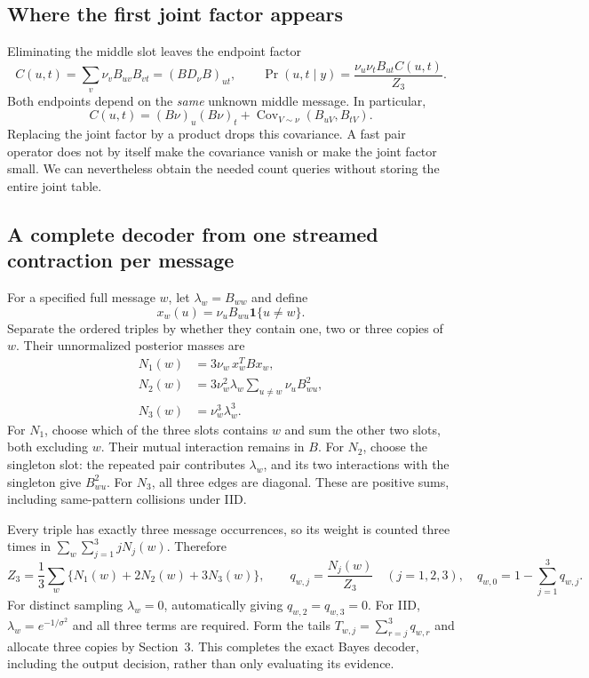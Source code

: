 \documentclass[10pt,a4paper]{article}
\newcommand{\ind}{\mathbf 1}
\begin{document}
\subsection{Where the first joint factor appears}
Eliminating the middle slot leaves the endpoint factor
\begin{equation}
 C(u,t)=\sum_v\nu_v B_{uv}B_{vt}=(BD_\nu B)_{ut},\qquad
 \Pr(u,t\mid y)=\frac{\nu_u\nu_t B_{ut}C(u,t)}{Z_3}.
 \label{eq:triangle-separator}
\end{equation}
Both endpoints depend on the \emph{same} unknown middle message. In particular,
\[
 C(u,t)=(B\nu)_u(B\nu)_t+
 \operatorname{Cov}_{V\sim\nu}(B_{uV},B_{tV}).
\]
Replacing the joint factor by a product drops this covariance. A fast pair operator does not by itself make
the covariance vanish or make the joint factor small. We can nevertheless obtain the needed count queries
without storing the entire joint table.

\clearpage
\subsection{A complete decoder from one streamed contraction per message}
For a specified full message $w$, let $\lambda_w=B_{ww}$ and define
\[
 x_w(u)=\nu_u B_{wu}\ind\{u\ne w\}.
\]
Separate the ordered triples by whether they contain one, two or three copies of $w$. Their unnormalized
posterior masses are
\begin{align}
 N_1(w)&=3\nu_w\,x_w^TBx_w,\label{eq:triangle-one}\\
 N_2(w)&=3\nu_w^2\lambda_w\sum_{u\ne w}\nu_uB_{wu}^2,
 \label{eq:triangle-two}\\
 N_3(w)&=\nu_w^3\lambda_w^3.\label{eq:triangle-three}
\end{align}
For $N_1$, choose which of the three slots contains $w$ and sum the other two slots, both excluding $w$.
Their mutual interaction remains in $B$. For $N_2$, choose the singleton slot: the repeated pair contributes
$\lambda_w$, and its two interactions with the singleton give $B_{wu}^2$. For $N_3$, all three edges are
diagonal. These are positive sums, including same-pattern collisions under IID.

Every triple has exactly three message occurrences, so its weight is counted three times in
$\sum_w\sum_{j=1}^3 jN_j(w)$. Therefore
\begin{equation}
 Z_3=\frac13\sum_w\{N_1(w)+2N_2(w)+3N_3(w)\},\qquad
 q_{w,j}=\frac{N_j(w)}{Z_3}\quad(j=1,2,3),\quad
 q_{w,0}=1-\sum_{j=1}^3q_{w,j}.
 \label{eq:triangle-counts}
\end{equation}
For distinct sampling $\lambda_w=0$, automatically giving $q_{w,2}=q_{w,3}=0$. For IID,
$\lambda_w=e^{-1/\sigma^2}$ and all three terms are required.
Form the tails $T_{w,j}=\sum_{r=j}^3q_{w,r}$ and allocate three copies by Section~3. This completes the exact
Bayes decoder, including the output decision, rather than only evaluating its evidence.
\end{document}
